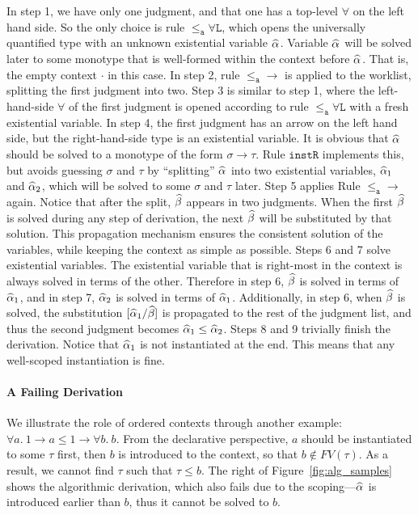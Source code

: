 In step 1, we have only one judgment, and that one has a top-level $\forall$ on
the left hand side. So the only choice is rule $\mathtt{{\le_a}\forall L}$, which
opens the universally quantified type with an unknown existential variable
$\al$. Variable $\al$ will be solved later to some monotype that is well-formed
within the context before $\al$. That is, the empty context $\cdot$ in this
case.
In step 2, rule $\mathtt{{\le_a}{\to}}$ is applied to the worklist,
splitting the first judgment into two.
Step 3 is similar to step 1, where the left-hand-side $\forall$ of the first
judgment is opened according to rule $\mathtt{{\le_a}\forall L}$ with a fresh
existential variable.
In step 4, the first judgment has an arrow on the left hand side, but the
right-hand-side type is an existential variable. It is obvious
that $\al$ should be solved to a monotype of the form
$\sigma \to \tau$. Rule $\mathtt{instR}$ implements this, but avoids
guessing $\sigma$ and $\tau$ by ``splitting'' $\al$ into two existential
variables, $\al[1]$ and $\al[2]$, which will be solved to some $\sigma$ and
$\tau$ later.
Step 5 applies Rule $\mathtt{{\le_a}{\to}}$ again. Notice that after the
split, $\bt$ appears in two judgments. When the first $\bt$ is solved
during any step of derivation, the next $\bt$ will be substituted by that
solution.  This propagation mechanism ensures the consistent solution of the
variables, while keeping the context as simple as possible.
Steps 6 and 7 solve existential variables. The existential
variable that is right-most in the context is always solved in terms of the other. Therefore in step 6,
$\bt$ is solved in terms of $\al[1]$, and in step 7, $\al[2]$ is solved in terms of $\al[1]$.
Additionally, in step 6, when $\bt$ is solved, the substitution $[\al[1] /
\bt]$ is propagated to the rest of the judgment list, and thus the second
judgment becomes $\al[1]\le\al[2]$.
Steps 8 and 9 trivially finish the derivation. Notice that $\al[1]$ is not
instantiated at the end. This means that any well-scoped instantiation is fine.

\paragraph{A Failing Derivation} We illustrate the role of ordered contexts through another example: $\forall a.\ 1\to a \le 1\to \forall b.\ b$. From the declarative perspective, $a$ should be instantiated to some $\tau$ first, then $b$ is introduced to the context, so that $b\notin FV(\tau)$. As a result, we cannot find $\tau$ such that $\tau \le b$. The right of Figure~\ref{fig:alg_samples} shows the algorithmic derivation, which also fails due to the scoping---$\al$ is introduced earlier than $b$, thus it cannot be solved to $b$.





